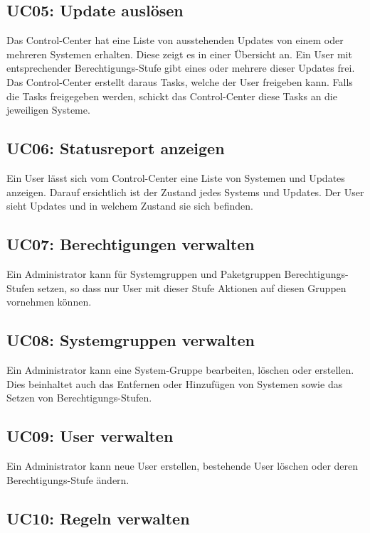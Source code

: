 \subsection*{UC05: Update auslösen}
\label{sec:uc_05}

Das Control-Center hat eine Liste von ausstehenden Updates von einem oder mehreren Systemen erhalten. Diese zeigt es in einer Übersicht an. Ein User mit entsprechender Berechtigungs-Stufe gibt eines oder mehrere dieser Updates frei. Das Control-Center erstellt daraus Tasks, welche der User freigeben kann. Falls die Tasks freigegeben werden, schickt das Control-Center diese Tasks an die jeweiligen Systeme.

\subsection*{UC06: Statusreport anzeigen}
\label{sec:uc_06}

Ein User lässt sich vom Control-Center eine Liste von Systemen und Updates anzeigen. Darauf ersichtlich ist der Zustand jedes Systems und Updates. Der User sieht Updates und in welchem Zustand sie sich befinden.

\subsection*{UC07: Berechtigungen verwalten}
\label{sec:uc_07}

Ein Administrator kann für Systemgruppen und Paketgruppen Berechtigungs-Stufen setzen, so dass nur User mit dieser Stufe Aktionen auf diesen Gruppen vornehmen können.

\subsection*{UC08: Systemgruppen verwalten}
\label{sec:uc_08}

Ein Administrator kann eine System-Gruppe bearbeiten, löschen oder erstellen. Dies beinhaltet auch das Entfernen oder Hinzufügen von Systemen sowie das Setzen von Berechtigungs-Stufen.

\subsection*{UC09: User verwalten}
\label{sec:uc_09}

Ein Administrator kann neue User erstellen, bestehende User löschen oder deren Berechtigungs-Stufe ändern.

\subsection*{UC10: Regeln verwalten}
\label{sec:uc_10}

